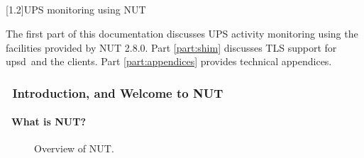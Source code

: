 \documentclass[12pt]{article}
\newlength{\headersep}\setlength{\headersep}{3mm}
\newcommand{\Hsep}{\hspace{\headersep}}
\newcommand{\upsd}{\mbox{\textcolor{UPSDCOLOUR}{upsd}}}
\newcommand{\UPSmon}{\mbox{\textcolor{UPSMONCOLOUR}{UPSmon.py}}}
\newcommand{\Vsoft}{2.8.0}
\begin{document}
\begin{center}
\part[\hspace{\fill}\textsf{UPS monitoring using NUT}\hspace{\fill}]{}\label{part:NUT}
\vspace{7mm}
\scalebox{1.0}[1.2]{\textsf{\Huge{UPS monitoring using NUT}}}
\vspace{7mm}
\end{center}

The first part of this documentation discusses UPS activity monitoring
using the facilities provided by NUT \Vsoft.  Part \ref{part:shim}
discusses TLS support for \upsd\ and the clients.
Part \ref{part:appendices} provides technical appendices.

\vspace{7mm}
\section{\Hsep\ Introduction, and Welcome to NUT}\label{section:intro}




\subsection{\Hsep\ What is NUT?}\label{whatisNUT}

\begin{figure}[ht]
\begin{center}
\end{center}
\vspace{-6mm}
\caption{Overview of NUT.\label{fig:overview-OL}}
\end{figure}
\end{document}
